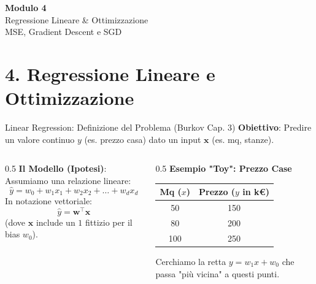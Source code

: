 \documentclass[aspectratio=169, 10pt]{beamer}
\begin{document}

\begin{frame}[plain]
    \centering
    \vspace{2cm}
    {\Huge \textbf{Modulo 4}}\\[0.5cm]
    {\Huge \textcolor{Accent}{Regressione Lineare \& Ottimizzazione}}\\[1cm]
    {\large MSE, Gradient Descent e SGD}
\end{frame}

\section{4. Regressione Lineare e Ottimizzazione}

\begin{frame}{Linear Regression: Definizione del Problema (Burkov Cap. 3)}
    \textbf{Obiettivo}: Predire un valore continuo $y$ (es. prezzo casa) dato un input $\mathbf{x}$ (es. mq, stanze).
    
    \begin{columns}[T]
        \begin{column}{0.5\textwidth}
            \textbf{Il Modello (Ipotesi)}:
            Assumiamo una relazione lineare:
            \[ \hat{y} = w_0 + w_1 x_1 + w_2 x_2 + \dots + w_d x_d \]
            In notazione vettoriale:
            \[ \hat{y} = \mathbf{w}^\top \mathbf{x} \]
            (dove $\mathbf{x}$ include un $1$ fittizio per il bias $w_0$).
        \end{column}
        \begin{column}{0.5\textwidth}
            \centering
            \textbf{Esempio "Toy": Prezzo Case}
            \vspace{0.5em}
            
            \begin{tabular}{cc}
                \toprule
                \textbf{Mq ($x$)} & \textbf{Prezzo ($y$ in k€)} \\
                \midrule
                50 & 150 \\
                80 & 200 \\
                100 & 250 \\
                \bottomrule
            \end{tabular}
            
            \vspace{0.5em}
            \small Cerchiamo la retta $y = w_1 x + w_0$ che passa "più vicina" a questi punti.
        \end{column}
    \end{columns}
\end{frame}
\end{document}
